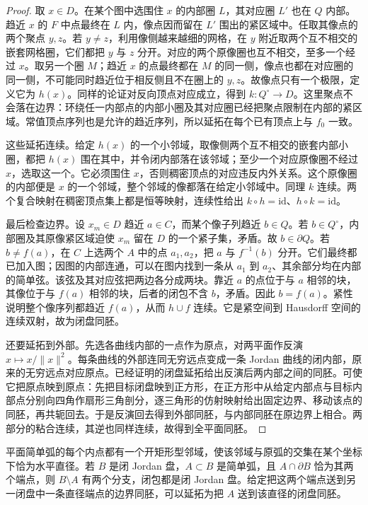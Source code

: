 \begin{proof}
	取 \(x\in D\)。在某个图中选围住 \(x\) 的内部圈 \(L\)，其对应圈 \(L'\) 也在 \(Q\) 内部。趋近 \(x\) 的 \(F\) 中点最终在 \(L\) 内，像点因而留在 \(L'\) 围出的紧区域中。任取其像点的两个聚点 \(y,z\)。若 \(y\ne z\)，利用像侧越来越细的网格，在 \(y\) 附近取两个互不相交的嵌套网格圈，它们都把 \(y\) 与 \(z\) 分开。对应的两个原像圈也互不相交，至多一个经过 \(x\)。取另一个圈 \(M\)；趋近 \(x\) 的点最终都在 \(M\) 的同一侧，像点也都在对应圈的同一侧，不可能同时趋近位于相反侧且不在圈上的 \(y,z\)。故像点只有一个极限，定义它为 \(h(x)\)。同样的论证对反向顶点对应成立，得到 \(k:Q^\circ\to D\)。这里聚点不会落在边界：环绕任一内部点的内部小圈及其对应圈已经把聚点限制在内部的紧区域。常值顶点序列也是允许的趋近序列，所以延拓在每个已有顶点上与 \(f_0\) 一致。

	这些延拓连续。给定 \(h(x)\) 的一个小邻域，取像侧两个互不相交的嵌套内部小圈，都把 \(h(x)\) 围在其中，并令闭内部落在该邻域；至少一个对应原像圈不经过 \(x\)，选取这一个。它必须围住 \(x\)，否则稠密顶点的对应违反内外关系。这个原像圈的内部便是 \(x\) 的一个邻域，整个邻域的像都落在给定小邻域中。同理 \(k\) 连续。两个复合映射在稠密顶点集上都是恒等映射，连续性给出 \(k\circ h=\mathrm{id}\)、\(h\circ k=\mathrm{id}\)。

	最后检查边界。设 \(x_m\in D\) 趋近 \(a\in C\)，而某个像子列趋近 \(b\in Q\)。若 \(b\in Q^\circ\)，内部圈及其原像紧区域迫使 \(x_m\) 留在 \(D\) 的一个紧子集，矛盾。故 \(b\in\partial Q\)。若 \(b\ne f(a)\)，在 \(C\) 上选两个 \(A\) 中的点 \(a_1,a_2\)，把 \(a\) 与 \(f^{-1}(b)\) 分开。它们最终都已加入图；因图的内部连通，可以在图内找到一条从 \(a_1\) 到 \(a_2\)、其余部分均在内部的简单弦。该弦及其对应弦把两边各分成两块。靠近 \(a\) 的点位于与 \(a\) 相邻的块，其像位于与 \(f(a)\) 相邻的块，后者的闭包不含 \(b\)，矛盾。因此 \(b=f(a)\)。紧性说明整个像序列都趋近 \(f(a)\)，从而 \(h\cup f\) 连续。它是紧空间到 Hausdorff 空间的连续双射，故为闭盘同胚。

	还要延拓到外部。先选各曲线内部的一点作为原点，对两平面作反演 \(x\mapsto x/\|x\|^2\)。每条曲线的外部连同无穷远点变成一条 Jordan 曲线的闭内部，原来的无穷远点对应原点。已经证明的闭盘延拓给出反演后两内部之间的同胚。可使它把原点映到原点：先把目标闭盘映到正方形，在正方形中从给定内部点与目标内部点分别向四角作扇形三角剖分，逐三角形的仿射映射给出固定边界、移动该点的同胚，再共轭回去。于是反演回去得到外部同胚，与内部同胚在原边界上相合。两部分的粘合连续，其逆也同样连续，故得到全平面同胚。
\end{proof}

\begin{lemma}\label{g1:lem:proper-arc-straightening}
	平面简单弧的每个内点都有一个开矩形型邻域，使该邻域与原弧的交集在某个坐标下恰为水平直径。若 \(B\) 是闭 Jordan 盘，\(A\subset B\) 是简单弧，且 \(A\cap\partial B\) 恰为其两个端点，则 \(B\setminus A\) 有两个分支，闭包都是闭 Jordan 盘。给定把这两个端点送到另一闭盘中一条直径端点的边界同胚，可以延拓为把 \(A\) 送到该直径的闭盘同胚。
\end{lemma}

